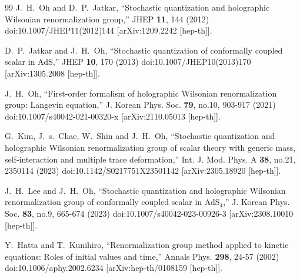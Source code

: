 \documentclass[12pt,epsbox]{article}
\numberwithin{equation}{section}
\begin{document}
\begin{thebibliography}{99}
J.~H.~Oh and D.~P.~Jatkar,
``Stochastic quantization and holographic Wilsonian renormalization group,''
JHEP \textbf{11}, 144 (2012)
doi:10.1007/JHEP11(2012)144
[arXiv:1209.2242 [hep-th]].

D.~P.~Jatkar and J.~H.~Oh,
``Stochastic quantization of conformally coupled scalar in AdS,''
JHEP \textbf{10}, 170 (2013)
doi:10.1007/JHEP10(2013)170
[arXiv:1305.2008 [hep-th]].

J.~H.~Oh,
``First-order formalism of holographic Wilsonian renormalization group: Langevin equation,''
J. Korean Phys. Soc. \textbf{79}, no.10, 903-917 (2021)
doi:10.1007/s40042-021-00320-x
[arXiv:2110.05013 [hep-th]].

G.~Kim, J.~s.~Chae, W.~Shin and J.~H.~Oh,
``Stochastic quantization and holographic Wilsonian renormalization group of scalar theory with generic mass, self-interaction and multiple trace deformation,''
Int. J. Mod. Phys. A \textbf{38}, no.21, 2350114 (2023)
doi:10.1142/S0217751X23501142
[arXiv:2305.18920 [hep-th]].

J.~H.~Lee and J.~H.~Oh,
``Stochastic quantization and holographic Wilsonian renormalization group of conformally coupled scalar in AdS$_{4}$,''
J. Korean Phys. Soc. \textbf{83}, no.9, 665-674 (2023)
doi:10.1007/s40042-023-00926-3
[arXiv:2308.10010 [hep-th]].

Y.~Hatta and T.~Kunihiro,
``Renormalization group method applied to kinetic equations: Roles of initial values and time,''
Annals Phys. \textbf{298}, 24-57 (2002)
doi:10.1006/aphy.2002.6234
[arXiv:hep-th/0108159 [hep-th]].


\end{thebibliography}
\end{document}

